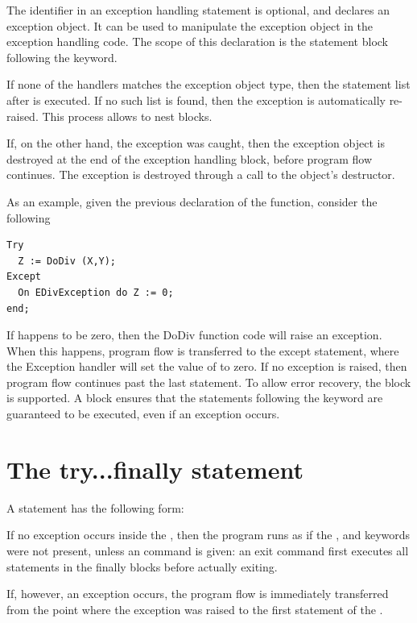 The identifier in an exception handling statement is optional, and declares
an exception object. It can be used to manipulate the exception object in
the exception handling code. The scope of this declaration is the statement
block following the  keyword.

If none of the  handlers matches the exception object type, then the
statement list after  is executed. If no such list is
found, then the exception is automatically re-raised. This process allows
to nest  blocks.

If, on the other hand, the exception was caught, then the exception object is
destroyed at the end of the exception handling block, before program flow
continues. The exception is destroyed through a call to the object's
 destructor.

As an example, given the previous declaration of the  function,
consider the following
\begin{verbatim}
Try
  Z := DoDiv (X,Y);
Except
  On EDivException do Z := 0;
end;
\end{verbatim}
If  happens to be zero, then the DoDiv function code will raise an
exception. When this happens, program flow is transferred to the except
statement, where the Exception handler will set the value of  to
zero. If no exception is raised, then program flow continues past the last
 statement.
To allow error recovery, the  block is supported.
A  block ensures that the statements following the
 keyword are guaranteed to be executed, even if an exception
occurs.


\section{The try...finally statement}
 

A  statement has the following form:

If no exception occurs inside the , then the program
runs as if the ,  and  keywords were not
present, unless an  command is given: an exit command first
executes all statements in the finally blocks before actually exiting.

If, however, an exception occurs, the program flow is immediately
transferred from the point where the exception was raised to the first
statement of the .

